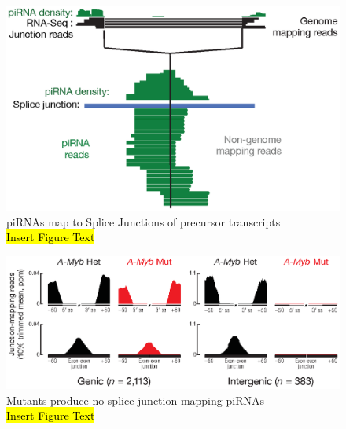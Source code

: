\begin{figure}[htbp]
	\centering 
	\includegraphics{Figures/AppendixB/smallRNAsMapToPrecursorSJ.eps}
	\caption[piRNAs map to Splice Junctions of precursor transcripts]
	{
		piRNAs map to Splice Junctions of precursor transcripts\\
		\hl{Insert Figure Text}
	}
	\label{fig: piRNAs map to SJ}
\end{figure}

\begin{figure}[htbp]
	\centering 
	\includegraphics{Figures/AppendixB/aggregatePiRNAsatSpliceJunctions.eps}
	\caption[\amyb{} Mutants produce no splice-junction mapping piRNAs]
	{
		\amyb{} Mutants produce no splice-junction mapping piRNAs\\
		\hl{Insert Figure Text}
	}
	\label{fig: amyb makes SJ mapping}
\end{figure}



